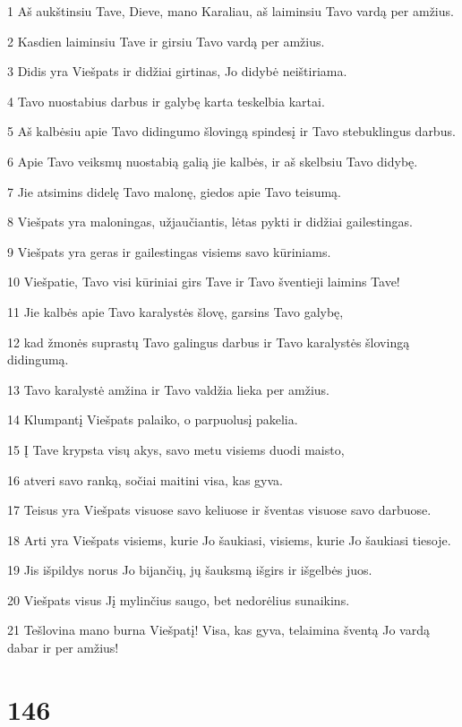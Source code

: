 \par 1 Aš aukštinsiu Tave, Dieve, mano Karaliau, aš laiminsiu Tavo vardą per amžius. 
\par 2 Kasdien laiminsiu Tave ir girsiu Tavo vardą per amžius. 
\par 3 Didis yra Viešpats ir didžiai girtinas, Jo didybė neištiriama. 
\par 4 Tavo nuostabius darbus ir galybę karta teskelbia kartai. 
\par 5 Aš kalbėsiu apie Tavo didingumo šlovingą spindesį ir Tavo stebuklingus darbus. 
\par 6 Apie Tavo veiksmų nuostabią galią jie kalbės, ir aš skelbsiu Tavo didybę. 
\par 7 Jie atsimins didelę Tavo malonę, giedos apie Tavo teisumą. 
\par 8 Viešpats yra maloningas, užjaučiantis, lėtas pykti ir didžiai gailestingas. 
\par 9 Viešpats yra geras ir gailestingas visiems savo kūriniams. 
\par 10 Viešpatie, Tavo visi kūriniai girs Tave ir Tavo šventieji laimins Tave! 
\par 11 Jie kalbės apie Tavo karalystės šlovę, garsins Tavo galybę, 
\par 12 kad žmonės suprastų Tavo galingus darbus ir Tavo karalystės šlovingą didingumą. 
\par 13 Tavo karalystė amžina ir Tavo valdžia lieka per amžius. 
\par 14 Klumpantį Viešpats palaiko, o parpuolusį pakelia. 
\par 15 Į Tave krypsta visų akys, savo metu visiems duodi maisto, 
\par 16 atveri savo ranką, sočiai maitini visa, kas gyva. 
\par 17 Teisus yra Viešpats visuose savo keliuose ir šventas visuose savo darbuose. 
\par 18 Arti yra Viešpats visiems, kurie Jo šaukiasi, visiems, kurie Jo šaukiasi tiesoje. 
\par 19 Jis išpildys norus Jo bijančių, jų šauksmą išgirs ir išgelbės juos. 
\par 20 Viešpats visus Jį mylinčius saugo, bet nedorėlius sunaikins. 
\par 21 Tešlovina mano burna Viešpatį! Visa, kas gyva, telaimina šventą Jo vardą dabar ir per amžius!


\chapter{146}


